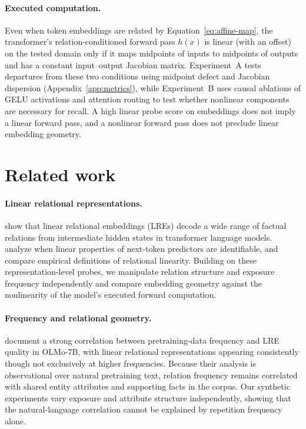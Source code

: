 \documentclass[11pt]{article}
\begin{document}
\paragraph{Executed computation.}
Even when token embeddings are related by Equation~\ref{eq:affine-map}, the
transformer's relation-conditioned forward pass $h(x)$ is linear (with an
offset) on the tested domain only if it maps midpoints of inputs to midpoints of
outputs and has a constant input--output Jacobian matrix. Experiment~A tests
departures from these two conditions using midpoint defect and Jacobian
dispersion (Appendix~\ref{app:metrics}), while Experiment~B uses causal
ablations of GELU activations and attention routing to test whether nonlinear
components are necessary for recall. A high linear probe score on embeddings
does not imply a linear forward pass, and a nonlinear forward pass does not
preclude linear embedding geometry.

\section{Related work}

\paragraph{Linear relational representations.}
\citet{hernandez2024linearity} show that linear relational embeddings (LREs)
decode a wide range of factual relations from intermediate hidden states in
transformer language models. \citet{marconato2025all} analyze when linear
properties of next-token predictors are identifiable, and
\citet{valer2026relational} compare empirical definitions of relational
linearity. Building on these representation-level probes, we manipulate
relation structure and exposure frequency independently and compare embedding
geometry against the nonlinearity of the model's executed forward computation.

\paragraph{Frequency and relational geometry.}
\citet{merullo2025frequency} document a strong correlation between
pretraining-data frequency and LRE quality in OLMo-7B, with linear relational
representations appearing consistently though not exclusively at higher
frequencies. Because their analysis is observational over natural pretraining
text, relation frequency remains correlated with shared entity attributes and
supporting facts in the corpus. Our synthetic experiments vary exposure and
attribute structure independently, showing that the natural-language correlation
cannot be explained by repetition frequency alone.
\end{document}
